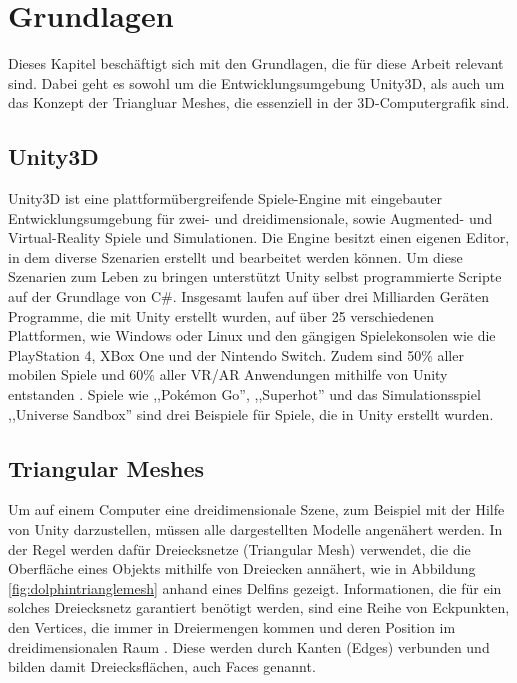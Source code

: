 \section{Grundlagen}
Dieses Kapitel besch\"aftigt sich mit den Grundlagen, die f\"ur diese Arbeit relevant sind. Dabei geht es sowohl um die Entwicklungsumgebung Unity3D, als auch um das Konzept der Triangluar Meshes, die essenziell in der 3D-Computergrafik sind.

\subsection{Unity3D}
Unity3D ist eine plattform\"ubergreifende Spiele-Engine mit eingebauter Entwicklungsumgebung f\"ur zwei- und dreidimensionale, sowie Augmented- und Virtual-Reality Spiele und Simulationen. Die Engine besitzt einen eigenen Editor, in dem diverse Szenarien erstellt und bearbeitet werden k\"onnen. Um diese Szenarien zum Leben zu bringen unterst\"utzt Unity selbst programmierte Scripte auf der Grundlage von C\#. Insgesamt laufen auf \"uber drei Milliarden Ger\"aten Programme, die mit Unity erstellt wurden, auf \"uber 25 verschiedenen Plattformen, wie Windows oder Linux und den g\"angigen Spielekonsolen wie die PlayStation 4, XBox One und der Nintendo Switch. Zudem sind 50\% aller mobilen Spiele und 60\% aller VR/AR Anwendungen mithilfe von Unity entstanden \cite{Unity}. Spiele wie ,,Pok\'emon Go'', ,,Superhot'' und das Simulationsspiel ,,Universe Sandbox'' sind drei Beispiele f\"ur Spiele, die in Unity erstellt wurden.

\subsection{Triangular Meshes}
Um auf einem Computer eine dreidimensionale Szene, zum Beispiel mit der Hilfe von Unity darzustellen, m\"ussen alle dargestellten Modelle angen\"ahert werden. In der Regel werden daf\"ur Dreiecksnetze (Triangular Mesh) verwendet, die die Oberfl\"ache eines Objekts mithilfe von Dreiecken ann\"ahert, wie in Abbildung \ref{fig:dolphintrianglemesh} anhand eines Delfins gezeigt. Informationen, die f\"ur ein solches Dreiecksnetz garantiert ben\"otigt werden, sind eine Reihe von Eckpunkten, den Vertices, die immer in Dreiermengen kommen und deren Position im dreidimensionalen Raum \cite[S.262]{Shirley2010}. Diese werden durch Kanten (Edges) verbunden und bilden damit Dreiecksfl\"achen, auch Faces genannt.


